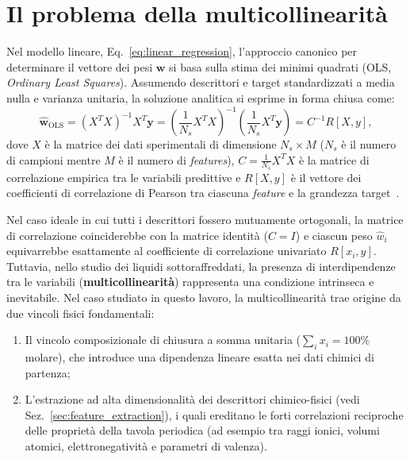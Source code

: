 \documentclass[../main.tex]{subfiles}
\begin{document}
	
	
	
	\section{Il problema della multicollinearità}
	\label{sec:multicollinearita}
	
	Nel modello lineare, Eq.~\eqref{eq:linear_regression}, l'approccio canonico per determinare il vettore dei pesi $\mathbf{w}$ si basa sulla stima dei minimi quadrati (OLS, \textit{Ordinary Least Squares}). Assumendo descrittori e target standardizzati a media nulla e varianza unitaria, la soluzione analitica si esprime in forma chiusa come:
	\begin{equation}
		\hat{\mathbf{w}}_{\text{OLS}} = (X^T X)^{-1} X^T \mathbf{y} = \left(\frac{1}{N_s}X^T X\right)^{-1} \left(\frac{1}{N_s}X^T \mathbf{y}\right) = C^{-1} R[X, y] ,
	\end{equation}
	dove $X$ è la matrice dei dati sperimentali di dimensione $N_s \times M$ ($N_s$ è il numero di campioni mentre $M$ è il numero di \textit{features}), $C = \frac{1}{N_s} X^T X$ è la matrice di correlazione empirica tra le variabili predittive e $R[X, y]$ è il vettore dei coefficienti di correlazione di Pearson tra ciascuna \textit{feature} e la grandezza target~\cite{sharmaInterpretabilityLinearRegression2026}.
	
	Nel caso ideale in cui tutti i descrittori fossero mutuamente ortogonali, la matrice di correlazione coinciderebbe con la matrice identità ($C = I$) e ciascun peso $\hat{w}_i$ equivarrebbe esattamente al coefficiente di correlazione univariato $R[x_i, y]$. Tuttavia, nello studio dei liquidi sottoraffreddati, la presenza di interdipendenze tra le variabili (\textbf{multicollinearità}) rappresenta una condizione intrinseca e inevitabile. Nel caso studiato in questo lavoro, la multicollinearità trae origine da due vincoli fisici fondamentali:
	\begin{enumerate}
		\item Il vincolo composizionale di chiusura a somma unitaria ($\sum_i x_i = 100\%$ molare), che introduce una dipendenza lineare esatta nei dati chimici di partenza;
		\item L'estrazione ad alta dimensionalità dei descrittori chimico-fisici (vedi Sez.~\ref{sec:feature_extraction}), i quali ereditano le forti correlazioni reciproche delle proprietà della tavola periodica (ad esempio tra raggi ionici, volumi atomici, elettronegatività e parametri di valenza).
	\end{enumerate}
	
\end{document}
